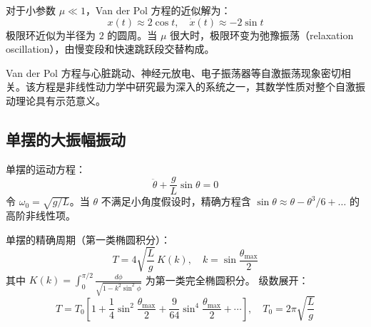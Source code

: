 \begin{myformula}
对于小参数 $\mu \ll 1$，Van der Pol 方程的近似解为：
\[
x(t) \approx 2\cos t, \quad \dot{x}(t) \approx -2\sin t
\]
极限环近似为半径为 $2$ 的圆周。当 $\mu$ 很大时，极限环变为弛豫振荡（relaxation oscillation），由慢变段和快速跳跃段交替构成。
\end{myformula}

\begin{remark}
Van der Pol 方程与心脏跳动、神经元放电、电子振荡器等自激振荡现象密切相关。该方程是非线性动力学中研究最为深入的系统之一，其数学性质对整个自激振动理论具有示范意义。
\end{remark}

\subsection{单摆的大振幅振动}
单摆的运动方程：
\[
\ddot{\theta} + \frac{g}{L}\sin\theta = 0
\]
令 $\omega_0 = \sqrt{g/L}$。当 $\theta$ 不满足小角度假设时，精确方程含 $\sin\theta \approx \theta - \theta^{3}/6 + \dots$ 的高阶非线性项。

\begin{myformula}
单摆的精确周期（第一类椭圆积分）：
\[
T = 4\sqrt{\frac{L}{g}}\,K(k), \quad k = \sin\frac{\theta_{\max}}{2}
\]
其中 $K(k) = \int_0^{\pi/2} \frac{d\phi}{\sqrt{1 - k^{2}\sin^{2}\phi}}$ 为第一类完全椭圆积分。
级数展开：
\[
T = T_0\left[1 + \frac{1}{4}\sin^{2}\frac{\theta_{\max}}{2} + \frac{9}{64}\sin^{4}\frac{\theta_{\max}}{2} + \cdots\right], \quad T_0 = 2\pi\sqrt{\frac{L}{g}}
\]
\end{myformula}

